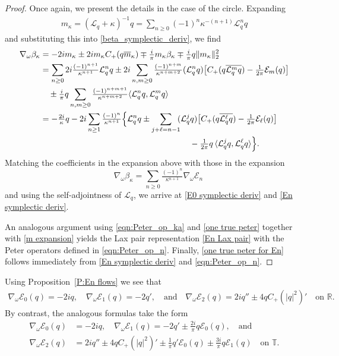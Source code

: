 \documentclass{amsart}
\numberwithin{equation}{section}
\theoremstyle{definition}
\newcommand{\om}{\omega}
\newcommand{\ka}{\kappa}
\newcommand{\R}{\mathbb{R}}
\newcommand{\T}{\mathbb{T}}
\newcommand{\Lc}{\mathcal{L}}
\newcommand{\na}{\nabla}
\newcommand{\lan}{\langle}
\newcommand{\ran}{\rangle}
\newcommand{\qtq}[1]{\quad\text{#1}\quad}
\begin{document}
\begin{proof}
Once again, we present the details in the case of the circle. Expanding
\begin{align}\label{m expansion}
m_\ka =(\Lc_q+\ka)^{-1}q=\sum_{n\geq0}(-1)^n\ka^{-(n+1)}\Lc_q^nq
\end{align}
and substituting this into \eqref{beta_symplectic_deriv}, we find
\begin{align*}
\na_\om\beta_\ka
&=-2im_\ka\pm 2im_\ka C_+(q\overline{m}_\ka)\mp\tfrac{i}{\pi} m_\ka \beta_\ka\mp\tfrac{i}{\pi}q\| m_\ka\|_2^2\\
&=\sum_{n\geq0}2i\tfrac{(-1)^{n+1}}{\ka^{n+1}}\Lc_q^nq\pm2i\sum_{n,m\geq 0}\tfrac{(-1)^{n+m}}{\ka^{n+m+2}}(\Lc_q^nq)\bigl[C_+(q\overline{\Lc_q^mq})-\tfrac{1}{2\pi}\mathcal{E}_m(q)\bigr]\\
&\quad\pm\tfrac{i}{\pi} q\sum_{n,m\geq 0}\tfrac{(-1)^{n+m+1}}{\ka^{n+m+2}}\lan \Lc_q^nq,\Lc_q^mq\ran\\
&=-\tfrac{2i}{\ka} q - 2i\sum_{n\geq1}\tfrac{(-1)^{n}}{\ka^{n+1}}\Bigl\{\Lc_q^nq\pm\sum_{j+\ell=n-1}\!\!(\Lc_q^jq)\bigl[C_+(q\overline{\Lc_q^\ell q})-\tfrac{1}{2\pi}\mathcal{E}_\ell(q)\bigr]\\
&\qquad\qquad\qquad\qquad \qquad\qquad\qquad \qquad \qquad - \tfrac{1}{2\pi}q\,\lan \Lc_q^jq,\Lc_q^\ell q\ran\Bigr\}.
\end{align*}
Matching the coefficients in the expansion above with those in the expansion
\begin{equation*}
\quad\na_\om\beta_\ka=\sum_{n\geq0}\tfrac{(-1)^{n}}{\ka^{n+1}}\na_\om\mathcal{E}_n
\end{equation*}
and using the self-adjointness of $\Lc_q$, we arrive at \eqref{E0 symplectic deriv} and \eqref{En symplectic deriv}.

An analogous argument using \eqref{eqn:Peter_op_ka} and \eqref{one true peter} together with \eqref{m expansion} yields the Lax pair representation \eqref{En Lax pair} with the Peter operators defined in \eqref{eqn:Peter_op_n}. Finally, \eqref{one true peter for En} follows immediately from \eqref{En symplectic deriv} and \eqref{eqn:Peter_op_n}.
\end{proof}

Using Proposition~\ref{P:En flows} we see that  
\begin{align*}
\na_\om\mathcal{E}_0(q)= -2iq, \quad \na_\om\mathcal{E}_1(q)=-2q', \qtq{and} \na_\om\mathcal{E}_2(q)=2iq''\pm4qC_+(|q|^2)'
	\quad\text{on $\R$.}
\end{align*}
By contrast, the analogous formulas take the form
\begin{align}
\na_\om\mathcal{E}_0(q)&= -2iq,\quad\na_\om\mathcal{E}_1(q)=-2q'\pm\tfrac{2i}{\pi}q\mathcal{E}_0(q), \quad\text{and}\label{eqn:E0 and E1}\\
\na_\om\mathcal{E}_2(q)&=2iq''\pm4qC_+(|q|^2)'\pm \tfrac1{\pi}q'\mathcal{E}_0(q)\pm\tfrac{3i}{\pi}q\mathcal{E}_1(q) \quad\text{on $\T$.} \label{eqn: E2}
\end{align}
\end{document}

